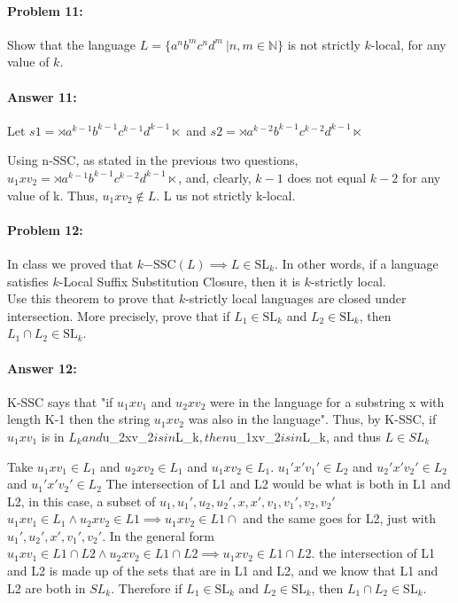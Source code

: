 \documentclass[10pt]{article}
\begin{document}
\paragraph{Problem 11:}

Show that the language $L= \{a^n b^m c^n d^m\ | n, m \in \mathbb{N} \}$ is not
strictly $k$-local, for any value of $k$.

\paragraph{Answer 11:} 
Let $s1 = \rtimes a^{k-1} b^{k-1} c^{k-1} d^{k-1} \ltimes$ 
and $s2 = \rtimes a^{k-2} b^{k-1} c^{k-2} d^{k-1} \ltimes$

Using n-SSC, as stated in the previous two questions, ${u_{1}xv_{2}}=\rtimes a^{k-1} b^{k-1} c^{k-2} d^{k-1} \ltimes$, and, clearly, $k-1$ does not equal $k-2$ for any value of k. Thus, ${u_{1}xv_{2}} \notin L$. L us not strictly k-local.


\noindent\hrulefill %

\paragraph{Problem 12:}

In class we proved that
$k\mathrm{-SSC}(L) \implies L \in \mathrm{SL}_k$. In other words, if a
language satisfies $k$-Local Suffix Substitution Closure, then it is
$k$-strictly local.\\

\noindent Use this theorem to prove that $k$-strictly local languages
are closed under intersection. More precisely, prove that if
$L_1 \in \mathrm{SL}_k$ and $L_2 \in \mathrm{SL}_k$, then
$L_1 \cap L_2 \in \mathrm{SL}_k$.

\paragraph{Answer 12:} K-SSC says that "if ${u_{1}xv_{1}}$ and ${u_{2}xv_{2}}$ were in the language for a substring x with length K-1 then the string ${u_{1}xv_{2}}$ was also in the language". Thus, by K-SSC, if $u_{1}xv_{1}$ is in $L_{k} and $u_{2}xv_{2}$ is in $L_{k}$, then $u_{1}xv_{2}$ is in $L_{k}, and thus $L \in SL_{k}$


Take $u_{1}xv_{1} \in L_{1}$ and $u_{2}xv_{2} \in L_{1}$ and $u_{1}xv_{2} \in L_{1}$.
$u_{1}'x'v_{1}' \in L_{2}$ and $u_{2}'x'v_{2}' \in L_{2}$ and $u_{1}'x'v_{2}' \in L_{2}$
The intersection of L1 and L2 would be what is both in L1 and L2, in this case, a subset of $u_{1}, u_{1}', u_{2}, u_{2}', x, x', v_{1}, v_{1}', v_{2}, v_{2}'$
$u_{1} x v_{1} \in L_1 \wedge u_{2} x v_{2} \in L1 \implies u_{1} x v_{2} \in L1 \cap$
and the same goes for L2, just with $u_{1}', u_{2}', x', v_{1}', v_{2}'$.
In the general form $u_{1} x v_{1} \in L1 \cap L2 \wedge u_{2} x v_{2} \in L1 \cap L2 \implies u_{1}x v_{2} \in L1 \cap L2$.
the intersection of L1 and L2 is made up of the sets that are in L1 and L2, and we know that L1 and L2 are both in $SL_{k}$.
Therefore if $L_1 \in \mathrm{SL}_k$ and $L_2 \in \mathrm{SL}_k$, then $L_1 \cap L_2 \in \mathrm{SL}_k$.
\end{document}
